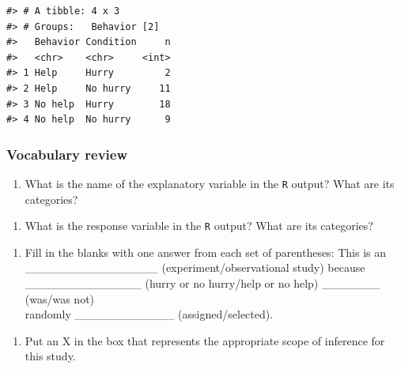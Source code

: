 \documentclass[
]{report}
\providecommand{\tightlist}{%
  \setlength{\itemsep}{0pt}\setlength{\parskip}{0pt}}
\begin{document}
\begin{verbatim}
#> # A tibble: 4 x 3
#> # Groups:   Behavior [2]
#>   Behavior Condition     n
#>   <chr>    <chr>     <int>
#> 1 Help     Hurry         2
#> 2 Help     No hurry     11
#> 3 No help  Hurry        18
#> 4 No help  No hurry      9
\end{verbatim}

\hypertarget{vocabulary-review-1}{%
\subsubsection*{Vocabulary review}\label{vocabulary-review-1}}

\begin{enumerate}
\def\labelenumi{\arabic{enumi}.}
\tightlist
\item
  What is the name of the explanatory variable in the \texttt{R} output? What are its categories?
\end{enumerate}

\vspace{0.2in}

\begin{enumerate}
\def\labelenumi{\arabic{enumi}.}
\setcounter{enumi}{1}
\tightlist
\item
  What is the response variable in the \texttt{R} output? What are its categories?
\end{enumerate}

\vspace{0.2in}


\begin{enumerate}
\def\labelenumi{\arabic{enumi}.}
\setcounter{enumi}{2}
\tightlist
\item
  Fill in the blanks with one answer from each set of parentheses: This is an\\
  \_\_\_\_\_\_\_\_\_\_\_\_\_\_\_\_ (experiment/observational study) because\\
  \_\_\_\_\_\_\_\_\_\_\_\_\_\_ (hurry or no hurry/help or no help) \_\_\_\_\_\_\_ (was/was not)\\
  randomly \_\_\_\_\_\_\_\_\_\_\_\_ (assigned/selected).
\end{enumerate}

\vspace{0.1in}

\begin{enumerate}
\def\labelenumi{\arabic{enumi}.}
\setcounter{enumi}{3}
\tightlist
\item
  Put an X in the box that represents the appropriate scope of inference for this study.
\end{enumerate}
\end{document}
